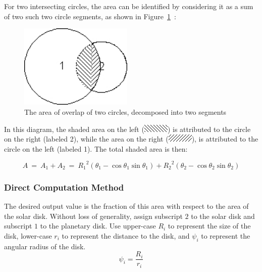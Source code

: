    For two intersecting circles, the area can be identified by considering it as
   a sum of two such two circle segments,
   as shown in Figure~\ref{fig:shadow_calc2}~:

   \begin{figure}[!ht]
   \begin{center}
    \includegraphics[height=40mm]{figs/shadow/shadow_calculator_fig2.jpg}
    \end{center}
    \caption{The area of overlap of two circles, decomposed into two segments}
    \label{fig:shadow_calc2}
   \end{figure}

   In this diagram, the shaded area on the left
   (\includegraphics{figs/shadow/shadow_calculator_fig3.jpg})
   is attributed to the circle on the right (labeled 2), while the area on the
   right
   (\includegraphics{figs/shadow/shadow_calculator_fig4.jpg}), is attributed to
   the circle on the left (labeled 1).
   The total shaded area is then:

   \begin{equation*}
   A\ =\ A_{1}+A_{2}\ =\ {R_{1}}^{2}(\theta _{1}-\cos \theta _{1}\sin
   \theta _{1})+{R_{2}}^{2}(\theta _{2}-\cos \theta _{2}\sin \theta _{2})
   \end{equation*}

   \subsubsection{Direct Computation Method}

   The desired output value is the fraction of this area with respect to the
   area of the solar disk.  Without loss of generality, assign subscript $2$
   to the solar disk and subscript $1$ to the planetary disk.  Use upper-case
   $R_i$ to represent the size of the disk, lower-case $r_i$ to represent the
   distance to the disk, and $\psi_i$ to represent the angular radius of the
   disk.
   \begin{equation*}
     \psi_i = \frac{R_i}{r_i}
   \end{equation*}

